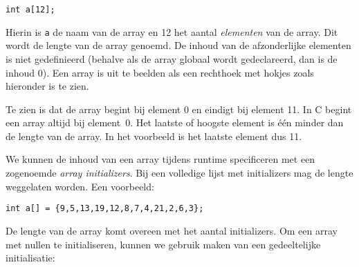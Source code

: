 \documentclass[a4paper,10pt,fleqn,twoside]{article}
\begin{document}
\begin{lstlisting}
int a[12];
\end{lstlisting}

Hierin is \verb|a| de naam van de array en 12 het aantal \textsl{elementen} van de array. Dit wordt de lengte van de array genoemd. De inhoud van de afzonderlijke elementen is niet gedefinieerd (behalve als de array globaal wordt gedeclareerd, dan is de inhoud 0).  Een array is uit te beelden als een rechthoek met hokjes zoals hieronder is te zien.

\begin{figure}[!ht]
\centering
{}
\end{figure}

Te zien is dat de array begint bij element 0 en eindigt bij element 11. In C begint een array altijd bij element~0. Het laatste of hoogste element is één minder dan de lengte van de array. In het voorbeeld is het laatste element dus 11.

%
%

We kunnen de inhoud van een array tijdens runtime specificeren met een zogenoemde \textsl{array initializers}. Bij een volledige lijst met initializers mag de lengte weggelaten worden. Een voorbeeld:

\begin{lstlisting}
int a[] = {9,5,13,19,12,8,7,4,21,2,6,3};
\end{lstlisting}

De lengte van de array komt overeen met het aantal initializers. Om een array met nullen te initialiseren, kunnen we gebruik maken van een gedeeltelijke initialisatie:
\end{document}
